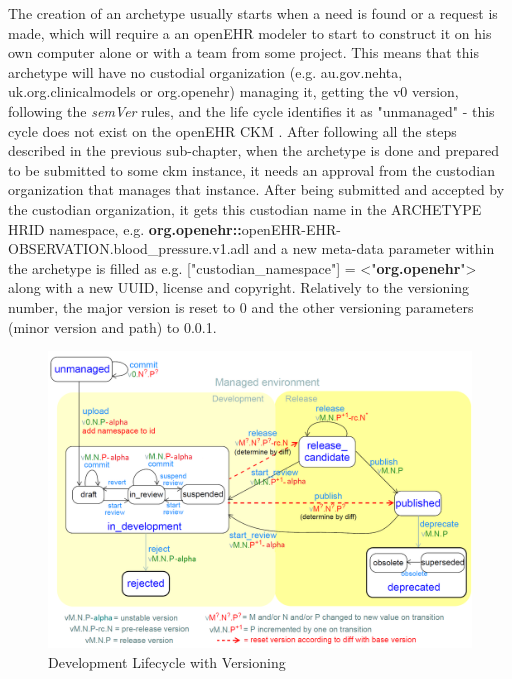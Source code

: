 \documentclass[mim_thesis.tex]{subfiles}
\begin{document}
The creation of an archetype usually starts when a need is found or a request is made, which will require a an openEHR modeler to start to construct it on his own computer alone or with a team from some project. This means that this archetype will have no custodial organization (e.g. au.gov.nehta, uk.org.clinicalmodels or org.openehr) managing it, getting the v0 version, following the \textit{semVer} rules, and the life cycle identifies it as "unmanaged" - this cycle does not exist on the openEHR CKM \citep{openehrckmgover2018}. After following all the steps described in the previous sub-chapter, when the archetype is done and prepared to be submitted to some ckm instance, it needs an approval from the custodian organization that manages that instance. After being submitted and accepted by the custodian organization, it gets this custodian name in the ARCHETYPE HRID namespace, e.g. \textbf{org.openehr::}openEHR-EHR-OBSERVATION.blood\_pressure.v1.adl and a new meta-data parameter within the archetype is filled as  e.g. ["custodian\_namespace"] = <"\textbf{org.openehr}"> along with a new UUID, license and copyright. Relatively to the versioning number, the major version is reset to 0 and the other versioning parameters (minor version and path) to 0.0.1. 

\begin{figure}[H]
	\centering
    \includegraphics[width=1\textwidth]{img/development_lifecycle_with_versioning.png}
	\caption{Development Lifecycle with Versioning \citep{openehrckmgover22018}}
	\label{fig:development_lifecycle_with_versioning}
\end{figure}
\end{document}
